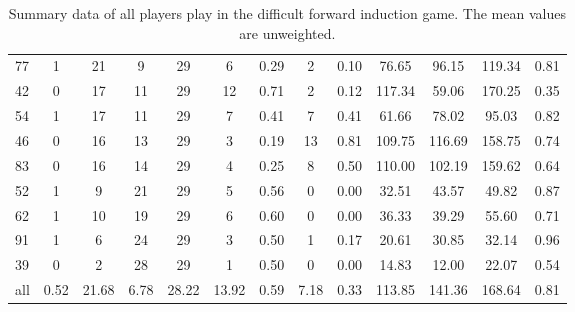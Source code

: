 \documentclass[a4paper,12pt,american]{article}
\theoremstyle{definition}
\begin{document}
\begin{table}[H]
{\begin{tabular}{lcccccccccccc}
	77  &     1 &        21 &      9 &    29 &       6 &    0.29 &      2 &   0.10 &   76.65 &   96.15 &  119.34 &  0.81 \\
	42  &     0 &        17 &     11 &    29 &      12 &    0.71 &      2 &   0.12 &  117.34 &   59.06 &  170.25 &  0.35 \\
	54  &     1 &        17 &     11 &    29 &       7 &    0.41 &      7 &   0.41 &   61.66 &   78.02 &   95.03 &  0.82 \\
	46  &     0 &        16 &     13 &    29 &       3 &    0.19 &     13 &   0.81 &  109.75 &  116.69 &  158.75 &  0.74 \\
	83  &     0 &        16 &     14 &    29 &       4 &    0.25 &      8 &   0.50 &  110.00 &  102.19 &  159.62 &  0.64 \\
	52  &     1 &         9 &     21 &    29 &       5 &    0.56 &      0 &   0.00 &   32.51 &   43.57 &   49.82 &  0.87 \\
	62  &     1 &        10 &     19 &    29 &       6 &    0.60 &      0 &   0.00 &   36.33 &   39.29 &   55.60 &  0.71 \\
	91  &     1 &         6 &     24 &    29 &       3 &    0.50 &      1 &   0.17 &   20.61 &   30.85 &   32.14 &  0.96 \\
	39  &     0 &         2 &     28 &    29 &       1 &    0.50 &      0 &   0.00 &   14.83 &   12.00 &   22.07 &  0.54 \\
	\midrule
	all &  0.52 &     21.68 &   6.78 &  28.22 &   13.92 &    0.59 &   7.18 &   0.33 &  113.85 &  141.36 &  168.64 &  0.81 \\
	\bottomrule
	\end{tabular}
	}
	\caption{Summary data of all players play in the difficult forward induction game. The mean values are unweighted.}
\end{table}
\end{document}
